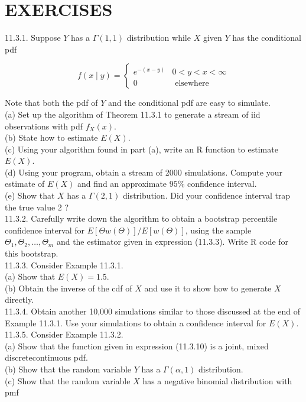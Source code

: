 \section*{EXERCISES}
11.3.1. Suppose $Y$ has a $\Gamma(1,1)$ distribution while $X$ given $Y$ has the conditional pdf

$$
f(x \mid y)= \begin{cases}e^{-(x-y)} & 0<y<x<\infty \\ 0 & \text { elsewhere }\end{cases}
$$

Note that both the pdf of $Y$ and the conditional pdf are easy to simulate.\\
(a) Set up the algorithm of Theorem 11.3.1 to generate a stream of iid observations with pdf $f_{X}(x)$.\\
(b) State how to estimate $E(X)$.\\
(c) Using your algorithm found in part (a), write an R function to estimate $E(X)$.\\
(d) Using your program, obtain a stream of 2000 simulations. Compute your estimate of $E(X)$ and find an approximate $95 \%$ confidence interval.\\
(e) Show that $X$ has a $\Gamma(2,1)$ distribution. Did your confidence interval trap the true value 2 ?\\
11.3.2. Carefully write down the algorithm to obtain a bootstrap percentile confidence interval for $E[\Theta w(\Theta)] / E[w(\Theta)]$, using the sample $\Theta_{1}, \Theta_{2}, \ldots, \Theta_{m}$ and the estimator given in expression (11.3.3). Write R code for this bootstrap.\\
11.3.3. Consider Example 11.3.1.\\
(a) Show that $E(X)=1.5$.\\
(b) Obtain the inverse of the cdf of $X$ and use it to show how to generate $X$ directly.\\
11.3.4. Obtain another 10,000 simulations similar to those discussed at the end of Example 11.3.1. Use your simulations to obtain a confidence interval for $E(X)$.\\
11.3.5. Consider Example 11.3.2.\\
(a) Show that the function given in expression (11.3.10) is a joint, mixed discretecontinuous pdf.\\
(b) Show that the random variable $Y$ has a $\Gamma(\alpha, 1)$ distribution.\\
(c) Show that the random variable $X$ has a negative binomial distribution with pmf


